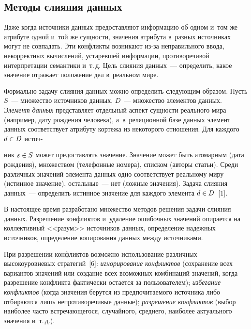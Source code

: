 \begin{multicols}{2}
\vspace*{-7pt}
    
\section{Методы слияния данных}

\vspace*{-3pt}

    Даже когда источники данных предоставляют информацию об одном и~том же атрибуте одной и~той же сущности, значения атрибута в~разных 
источниках могут не совпадать. Эти конфликты возникают из-за 
неправильного ввода, некорректных вычислений, устаревшей информации, 
противоречивой интерпретации семантики и~т.\,д. Цель слияния данных~--- 
определить, какое значение отражает положение дел в~реальном мире.
    
    Формально задачу слияния данных можно определить следующим 
образом. Пусть $S$~--- множество источников данных, $D$~--- множество 
элементов данных. \textit{Элемент данных} представляет отдельный аспект 
сущности реального мира (например, дату рождения человека), 
а~в~реляционной базе данных элемент данных соответствует атрибуту 
кортежа из некоторого отношения. Для каждого $d\hm\in D$ источ-\linebreak\vspace*{-12pt}

\pagebreak

\noindent
ник 
$s\hm\in S$ может предоставлять значение. Значение может быть атомарным 
(дата рождения), множеством (телефонные номера), списком (авторы \mbox{статьи}). 
Среди различных значений элемента данных одно соответствует реальному 
миру (истинное значение), остальные~--- нет (ложные значения). Задача 
слияния данных~--- определить истинное значение для каждого элемента 
$d\hm\in D$~[1]. 
    
    В настоящее время разработано множество методов решения задачи 
слияния данных. Разрешение конфликтов и~удаление ошибочных значений 
опирается на коллективный <<разум>> источников данных, определение 
надежных источников, определение копирования данных между 
источниками. 
    
    При разрешении конфликтов возможно использование различных 
высокоуровневых стратегий~[6]: \textit{игнорирование конфликтов} 
(сохранение всех вариантов значений или создание всех возможных 
комбинаций значений, когда разрешение конфликта фактически остается за 
пользователем); \textit{избегание конфликтов} (когда значения берутся из 
предпочитаемого источника либо отбираются лишь непротиворечивые 
данные); \textit{разрешение конфликтов} (выбор наиболее часто 
встречающегося, случайного, среднего, наиболее актуального значения 
и~т.\,д.).
    

\end{multicols}
